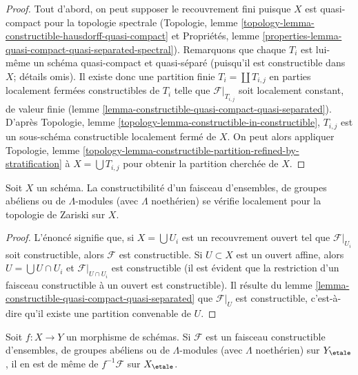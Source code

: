 \begin{proof}
Tout d'abord, on peut supposer le recouvrement fini puisque $X$ est quasi-compact
pour la topologie spectrale
(Topologie, lemme \ref{topology-lemma-constructible-hausdorff-quasi-compact}
et
Propriétés, lemme
\ref{properties-lemma-quasi-compact-quasi-separated-spectral}).
Remarquons que chaque $T_i$ est lui-même un schéma quasi-compact et quasi-séparé
(puisqu'il est constructible dans $X$; détails omis).
Il existe donc une partition finie $T_i = \coprod T_{i, j}$ en
parties localement fermées constructibles de $T_i$ telle que
$\mathcal{F}|_{T_{i, j}}$ soit localement constant, de valeur finie
(lemme \ref{lemma-constructible-quasi-compact-quasi-separated}).
D'après Topologie, lemme \ref{topology-lemma-constructible-in-constructible},
$T_{i, j}$ est un sous-schéma constructible localement fermé de $X$.
On peut alors appliquer Topologie, lemme
\ref{topology-lemma-constructible-partition-refined-by-stratification}
à $X = \bigcup T_{i, j}$ pour obtenir la partition cherchée de $X$.
\end{proof}

\begin{lemma}
\label{lemma-constructible-local}
Soit $X$ un schéma. La constructibilité d'un faisceau
d'ensembles, de groupes abéliens ou de $\Lambda$-modules (avec $\Lambda$ noethérien)
se vérifie localement pour la topologie de Zariski sur $X$.
\end{lemma}

\begin{proof}
L'énoncé signifie que, si $X = \bigcup U_i$ est un recouvrement ouvert
tel que $\mathcal{F}|_{U_i}$ soit constructible, alors $\mathcal{F}$
est constructible. Si $U \subset X$ est un ouvert affine, alors
$U = \bigcup U \cap U_i$ et $\mathcal{F}|_{U \cap U_i}$ est constructible
(il est évident que la restriction d'un faisceau constructible à
un ouvert est constructible). Il résulte du
lemme \ref{lemma-constructible-quasi-compact-quasi-separated}
que $\mathcal{F}|_U$ est constructible, c'est-à-dire qu'il existe une partition convenable
de $U$.
\end{proof}

\begin{lemma}
\label{lemma-pullback-constructible}
Soit $f : X \to Y$ un morphisme de schémas. Si $\mathcal{F}$ est un
faisceau constructible d'ensembles, de groupes abéliens ou de $\Lambda$-modules
(avec $\Lambda$ noethérien) sur $Y_\etale$, il en est de même
de $f^{-1}\mathcal{F}$ sur $X_\etale$.
\end{lemma}

